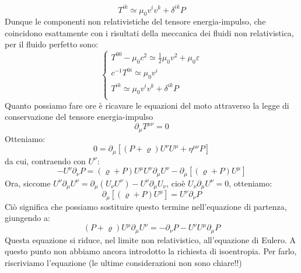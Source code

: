 \documentclass[a4paper,11pt]{book}
\theoremstyle{plain}
\theoremstyle{definition}
\begin{document}
\[
T^{ik} \simeq \mu_0v^{i}v^{k}+\delta^{ik}P
\]
Dunque le componenti non relativistiche del tensore energia-impulso, che coincidono esattamente con i risultati della meccanica dei fluidi non relativistica, per il fluido perfetto sono:
\begin{equation}
\begin{cases}
T^{00} - \mu_0c^2 \simeq \frac{1}{2}\mu_0v^2+\mu_0\varepsilon \\
c^{-1}T^{0i} \simeq \mu_0v^i \\
T^{ik} \simeq \mu_0v^{i}v^{k}+\delta^{ik}P \\
\end{cases}
\end{equation}
Quanto possiamo fare ore è ricavare le equazioni del moto attraverso la legge di conservazione del tensore energia-impulso
\[
\partial_{\mu}T^{\mu\nu}=0
\]
Otteniamo:
\[
0 = \partial_{\mu}\left[ (P+\varrho)U^{\nu}U^{\mu}+\eta^{\mu\nu}P \right]
\]
da cui, contraendo con $U^{\nu}$:
\[
-U^{\nu}\partial_{\nu}P = (\varrho+P)U^{\mu}U^{\nu}\partial_{\mu}U^{\nu}-\partial_{\mu}[ (\varrho+P)U^{\mu}]
\]
Ora, siccome $U^{\nu}\partial_{\mu}U^{\nu} = \partial_{\mu}(U_{\nu}U^{\nu})-U^{\nu}\partial_{\mu}U_{\nu}$, cioè $U_{\nu}\partial_{\mu}U^{\nu}=0$, otteniamo:
\[
\partial_{\mu}[(\varrho+P)U^{\mu}] = U^{\nu}\partial_{\nu}P
\]
Ciò significa che possiamo sostituire questo termine nell'equazione di partenza, giungendo a:
\begin{equation}
(P+\varrho)U^{\mu}\partial_{\mu}U^{\nu} = -\partial_{\nu}P-U^{\nu}U^{\mu}\partial_{\mu}P
\end{equation}
Questa equazione si riduce, nel limite non relativistico, all'equazione di Eulero. A questo punto non abbiamo ancora introdotto la richiesta di isoentropia. Per farlo, riscriviamo l'equazione (le ultime considerazioni non sono chiare!!) 
\end{document}
